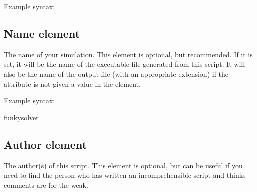 \documentclass[letterpaper,10pt,english]{sphinxmanual}
\begin{document}
\sphinxAtStartPar
Example syntax:

\begin{sphinxVerbatim}[commandchars=\\\{\}]
 
\end{sphinxVerbatim}

\ignorespaces 

\subsection{Name element}
\label{\detokenize{reference_elements:name-element}}\label{\detokenize{reference_elements:nameelement}}\label{\detokenize{reference_elements:index-2}}
\sphinxAtStartPar
The name of your simulation. This element is optional, but recommended. If it is set, it will be the name of the executable file generated from this script. It will also be the name of the output file (with an appropriate extension) if the  attribute is not given a value in the  element.

\sphinxAtStartPar
Example syntax:

\begin{sphinxVerbatim}[commandchars=\\\{\}]
 funky\PYGZus{}solver 
\end{sphinxVerbatim}

\ignorespaces 

\subsection{Author element}
\label{\detokenize{reference_elements:author-element}}\label{\detokenize{reference_elements:authorelement}}\label{\detokenize{reference_elements:index-3}}
\sphinxAtStartPar
The author(s) of this script. This element is optional, but can be useful if you need to find the person who has written an incomprehensible script and thinks comments are for the weak.
\end{document}

